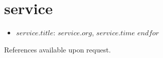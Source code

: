 \documentclass[]{friggeri-cv}
\begin{document}
\section{service}
\begin{itemize}[noitemsep, leftmargin=0.55in]
$for(service)$
  \item $service.title$: $service.org$, $service.time$ 
$endfor$
\end{itemize}






\vspace{0.2in}
References available upon request.
\end{document}
